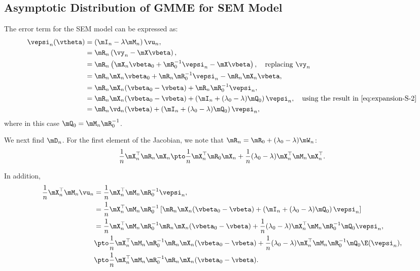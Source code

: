 \documentclass[english,12pt]{book}\usepackage[]{graphicx}\usepackage[]{xcolor}
\begin{document}
\begin{subappendices}

\section{Asymptotic Distribution of GMME for SEM Model}

The error term for the SEM model can be expressed as:
\begin{equation*}
\begin{aligned}
\vepsi_n(\vtheta) & = \left(\mI_n - \lambda\mM_n\right)\vu_n, \\
& = \mR_n\left(\vy_n - \mX\vbeta\right), \\
& = \mR_n\left(\mX_n\vbeta_0 + \mR_0^{-1}\vepsi_n - \mX\vbeta\right),\quad \mbox{replacing $\vy_n$} \\
& = \mR_n\mX_n\vbeta_0 + \mR_n\mR_0^{-1}\vepsi_n - \mR_n\mX_n\vbeta, \\
& = \mR_n\mX_n(\vbeta_0 - \vbeta) + \mR_n\mR_0^{-1}\vepsi_n, \\
& = \mR_n\mX_n(\vbeta_0 - \vbeta) + \left(\mI_n + (\lambda_0 - \lambda)\mQ_0\right)\vepsi_n, \quad \mbox{using the result in \eqref{eq:expansion-S-2}} \\
& = \mR_n\vd_n(\vbeta) + \left(\mI_n + (\lambda_0 - \lambda)\mQ_0\right)\vepsi_n,
\end{aligned}
\end{equation*}
%
where in this case $\mQ_0 = \mM_n\mR_0^{-1}$. 

We next find $\mD_n$. For the first element of the Jacobian, we note that $\mR_n = \mR_0 + (\lambda_0 - \lambda)\mW_n$:
\begin{equation*}
\frac{1}{n}\mX_n^\top\mR_n\mX_n \pto \frac{1}{n}\mX_n^\top\mR_0\mX_n +\frac{1}{n}(\lambda_0 - \lambda)\mX^\top_n\mM_n\mX_n^\top.
\end{equation*}

In addition, 
\begin{equation*}
\begin{aligned}
  \frac{1}{n}\mX_n^\top\mM_n\vu_n & = \frac{1}{n}\mX_n^\top\mM_n\mR_0^{-1}\vepsi_n, \\
                                  & = \frac{1}{n}\mX_n^\top\mM_n\mR_0^{-1}\left[\mR_n\mX_n(\vbeta_0 - \vbeta) + \left(\mI_n + (\lambda_0 - \lambda)\mQ_0\right)\vepsi_n\right] \\
                                  & = \frac{1}{n}\mX_n^\top\mM_n\mR_0^{-1}\mR_n\mX_n(\vbeta_0 - \vbeta) + \frac{1}{n}(\lambda_0 - \lambda)\mX_n^\top\mM_n\mR_0^{-1}\mQ_0\vepsi_n, \\
                                  & \pto \frac{1}{n}\mX_n^\top\mM_n\mR_0^{-1}\mR_n\mX_n(\vbeta_0 - \vbeta) + \frac{1}{n}(\lambda_0 - \lambda)\mX_n^\top\mM_n\mR_0^{-1}\mQ_0\E(\vepsi_n), \\
                                  & \pto \frac{1}{n}\mX_n^\top\mM_n\mR_0^{-1}\mR_n\mX_n(\vbeta_0 - \vbeta).
\end{aligned}
\end{equation*}


\end{subappendices}
\end{document}
